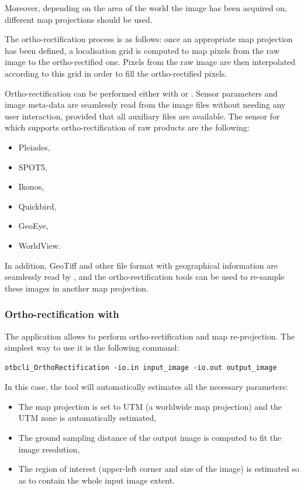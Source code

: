 Moreover, depending on the area of the world the image has been
acquired on, different map projections should be used.

The ortho-rectification process is as follows: once an appropriate map
projection has been defined, a localisation grid is computed to map
pixels from the raw image to the ortho-rectified one. Pixels from the
raw image are then interpolated according to this grid in order to
fill the ortho-rectified pixels.

Ortho-rectification can be performed either with \app or \mont. Sensor
parameters and image meta-data are seamlessly read from the image
files without needing any user interaction, provided that all
auxiliary files are available. The sensor for which \otb
supports ortho-rectification of raw products are the following:
\begin{itemize}
\item Pleiades,
\item SPOT5,
\item Ikonos,
\item Quickbird,
\item GeoEye,
\item WorldView.
\end{itemize}

In addition, GeoTiff and other file format with geographical
information are seamlessly read by \otb, and the ortho-rectification
tools can be used to re-sample these images in another map projection.

\subsubsection{Ortho-rectification with \app}

The  application allows to
perform ortho-rectification and map re-projection. The simplest way to
use it is the following command:
\begin{verbatim}
otbcli_OrthoRectification -io.in input_image -io.out output_image
\end{verbatim}

In this case, the tool will automatically estimates all the necessary
parameters:
\begin{itemize}
\item The map projection is set to UTM (a worldwide map projection)
  and the UTM zone is automatically estimated,
\item The ground sampling distance of the output image is computed to
  fit the image resolution,
\item The region of interest (upper-left corner and size of the image)
  is estimated so as to contain the whole input image extent.
\end{itemize}

